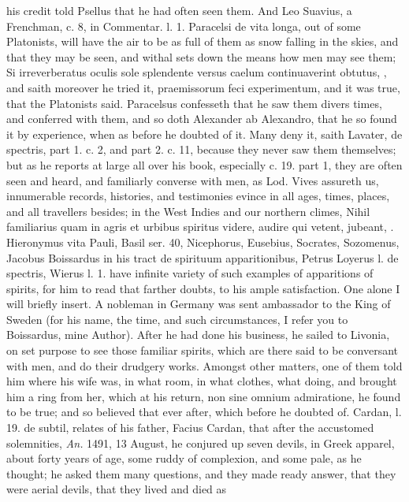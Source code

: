 {his credit told Psellus that he had often seen them. And Leo Suavius, a
Frenchman, c. 8, in Commentar. l. 1. Paracelsi de vita longa, out of
some Platonists, will have the air to be as full of them as snow
falling in the skies, and that they may be seen, and withal sets down
the means how men may see them; Si irreverberatus oculis sole
splendente versus caelum continuaverint obtutus, \etc{}, and saith
moreover he tried it, praemissorum feci experimentum, and it was true,
that the Platonists said. Paracelsus confesseth that he saw them divers
times, and conferred with them, and so doth Alexander ab
Alexandro, that he so found it by experience, when as before he
doubted of it. Many deny it, saith Lavater, de spectris, part 1. c. 2,
and part 2. c. 11, because they never saw them themselves; but as he
reports at large all over his book, especially c. 19. part 1, they are
often seen and heard, and familiarly converse with men, as Lod. Vives
assureth us, innumerable records, histories, and testimonies evince in
all ages, times, places, and all travellers besides; in the West
Indies and our northern climes, Nihil familiarius quam in agris et
urbibus spiritus videre, audire qui vetent, jubeant, \etc{}. Hieronymus
vita Pauli, Basil ser. 40, Nicephorus, Eusebius, Socrates, Sozomenus,
Jacobus Boissardus in his tract de spirituum apparitionibus,
Petrus Loyerus l. de spectris, Wierus l. 1. have infinite variety of
such examples of apparitions of spirits, for him to read that farther
doubts, to his ample satisfaction. One alone I will briefly insert. A
nobleman in Germany was sent ambassador to the King of Sweden (for his
name, the time, and such circumstances, I refer you to Boissardus, mine
Author). After he had done his business, he sailed to Livonia, on
set purpose to see those familiar spirits, which are there said to be
conversant with men, and do their drudgery works. Amongst other
matters, one of them told him where his wife was, in what room, in what
clothes, what doing, and brought him a ring from her, which at his
return, non sine omnium admiratione, he found to be true; and so
believed that ever after, which before he doubted of. Cardan, l. 19. de
subtil, relates of his father, Facius Cardan, that after the accustomed
solemnities, \emph{An.} 1491, 13 August, he conjured up seven devils, in
Greek apparel, about forty years of age, some ruddy of complexion, and
some pale, as he thought; he asked them many questions, and they made
ready answer, that they were aerial devils, that they lived and died as
}
